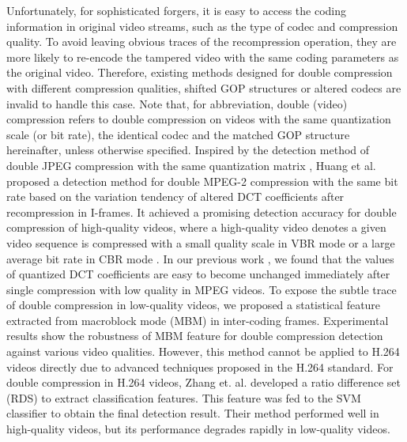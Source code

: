 \documentclass[journal,sort]{IEEEtran}
\begin{document}
Unfortunately, for sophisticated forgers, it is easy to access the coding information in original video streams, such as the type of codec and compression quality. To avoid leaving obvious traces of the recompression operation, they are more likely to re-encode the tampered video with the same coding parameters as the original video. Therefore, existing methods designed for double compression with different compression qualities, shifted GOP structures or altered codecs are invalid to handle this case. Note that, for abbreviation, double (video) compression refers to double compression on videos with the same quantization scale (or bit rate), the identical codec and the matched GOP structure hereinafter, unless otherwise specified. Inspired by the detection method of double JPEG compression with the same quantization matrix \cite{huang2010detecting}, Huang et al. proposed a detection method for double MPEG-2 compression with the same bit rate \cite{huang2014detection} based on the variation tendency of altered DCT coefficients after recompression in I-frames. It achieved a promising detection accuracy for double compression of high-quality videos, where a high-quality video denotes a given video sequence is compressed with a small quality scale in VBR mode or a large average bit rate in CBR mode \cite{tan2016video,tu2017variational}. In our previous work \cite{chen2016detecting}, we found that the values of quantized DCT coefficients are easy to become unchanged immediately after single compression with low quality in MPEG videos. To expose the subtle trace of double compression in low-quality videos, we proposed a statistical feature extracted from macroblock mode (MBM) in inter-coding frames. Experimental results show the robustness of MBM feature for double compression detection against various video qualities. However, this method \cite{chen2016detecting} cannot be applied to H.264 videos directly due to advanced techniques proposed in the H.264 standard. For double compression in H.264 videos, Zhang et. al. developed a ratio difference set (RDS) to extract classification features\cite{zhang2016detecting}. This feature was fed to the SVM classifier to obtain the final detection result. Their method performed well in high-quality videos, but its performance degrades rapidly in low-quality videos. 
\end{document}
